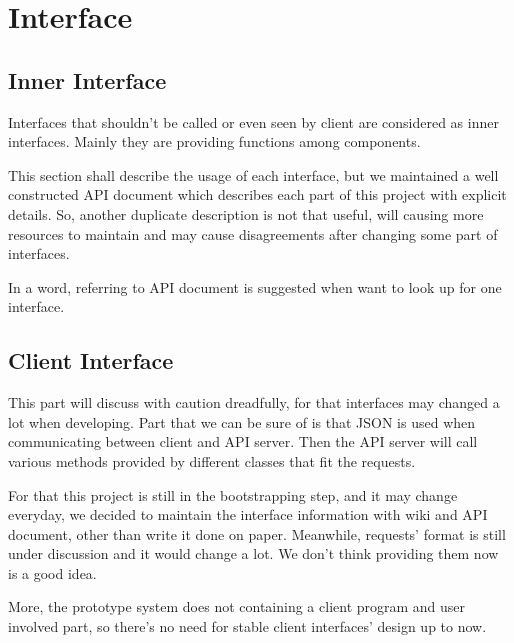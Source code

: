 \section{Interface}
  \subsection{Inner Interface}
    Interfaces that shouldn't be called or even seen by client are considered as inner interfaces.
    Mainly they are providing functions among components.

    This section shall describe the usage of each interface,
    but we maintained a well constructed API document which describes each part of this project with explicit details.
    So, another duplicate description is not that useful,
    will causing more resources to maintain and may cause disagreements after changing some part of interfaces.

    In a word, referring to API document is suggested when want to look up for one interface.

  \subsection{Client Interface}
    This part will discuss with caution dreadfully,
    for that interfaces may changed a lot when developing.
    Part that we can be sure of is that JSON is used when communicating between client and API server.
    Then the API server will call various methods provided by different classes that fit the requests.

    For that this project is still in the bootstrapping step, and it may change everyday, we decided to maintain the interface information with
    wiki and API document, other than write it done on paper.
    Meanwhile, requests' format is still under discussion and it would change a lot. We don't think providing them now is a good idea.

    More, the prototype system does not containing a client program and user involved part,
    so there's no need for stable client interfaces' design up to now.

